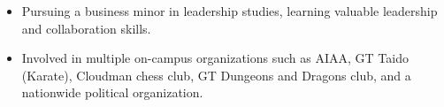 \begin{tcolorbox}
\begin{minipage}[t]{0.825\textwidth}
\begin{tcolorbox}[grow to right by=0.95cm,height=0.85\textheight,colframe=white,colback=white]
{\begin{itemize}
                        \item Pursuing a business minor in leadership studies, learning valuable leadership and collaboration skills. 

                        \item Involved in multiple on-campus organizations such as AIAA, GT Taido (Karate), Cloudman chess club, GT Dungeons and Dragons club, and a nationwide political organization.

                        
                    \end{itemize}}

                    \vspace{1em}

            \end{tcolorbox}
        \end{minipage}
    \end{tcolorbox}
    
